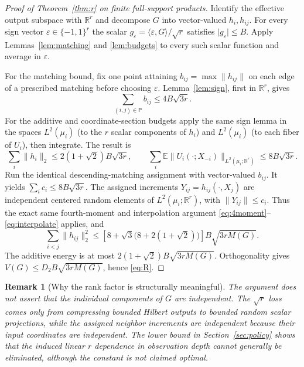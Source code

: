 \documentclass[11pt,letterpaper]{article}
\newtheorem{remark}[theorem]{Remark}
\theoremstyle{definition}\newtheorem{definition}[theorem]{Definition}
\newcommand{\E}{\mathbb E}
\newcommand{\abs}[1]{\lvert #1\rvert}
\newcommand{\norm}[1]{\lVert #1\rVert}
\begin{document}
\begin{proof}[Proof of Theorem~\ref{thm:r} on finite full-support products]
Identify the effective output subspace with $\mathbb R^r$ and decompose $G$ into vector-valued $h_i,h_{ij}$. For every sign vector $\varepsilon\in\{-1,1\}^r$ the scalar $g_\varepsilon=\langle\varepsilon,G\rangle/\sqrt r$ satisfies $\abs{g_\varepsilon}\le B$. Apply Lemmas~\ref{lem:matching} and \ref{lem:budgets} to every such scalar function and average in $\varepsilon$.

For the matching bound, fix one point attaining $b_{ij}=\max\norm{h_{ij}}$ on each edge of a prescribed matching before choosing $\varepsilon$. Lemma~\ref{lem:sign}, first in $\mathbb R^r$, gives
\begin{equation}\label{eq:vectorbudgets}
\sum_{(i,j)\in\mathsf P}b_{ij}\le4B\sqrt{3r}.
\end{equation}
For the additive and coordinate-section budgets apply the same sign lemma in the spaces $L^2(\mu_i)$ (to the $r$ scalar components of $h_i$) and $L^2(\mu_i)$ (to each fiber of $U_i$), then integrate. The result is
\begin{equation}\label{eq:vectorbudget2}
\sum_i\norm{h_i}_2\le2(1+\sqrt2)B\sqrt{3r},\qquad
\sum_i\E\norm{U_i(\cdot;X_{-i})}_{L^2(\mu_i;\mathbb R^r)}\le8B\sqrt{3r}.
\end{equation}
Run the identical descending-matching assignment with vector-valued $b_{ij}$. It yields $\sum_i c_i\le8B\sqrt{3r}$. The assigned increments $Y_{ij}=h_{ij}(\cdot,X_j)$ are independent centered random elements of $L^2(\mu_i;\mathbb R^r)$, with $\norm{Y_{ij}}\le c_i$. Thus the exact same fourth-moment and interpolation argument \eqref{eq:4moment}--\eqref{eq:interpolate} applies, and
\[
\sum_{i<j}\norm{h_{ij}}_2^2\le
\left[8+\sqrt3\bigl(8+2(1+\sqrt2)\bigr)\right]B\sqrt{3rM(G)}.
\]
The additive energy is at most $2(1+\sqrt2)B\sqrt{3rM(G)}$. Orthogonality gives $V(G)\le D_2 B\sqrt{3rM(G)}$, hence \eqref{eq:R}.
\end{proof}

\begin{remark}[Why the rank factor is structurally meaningful]
The argument does not assert that the individual components of $G$ are independent. The $\sqrt r$ loss comes only from compressing bounded Hilbert outputs to bounded random scalar projections, while the assigned neighbor increments are independent because their \emph{input coordinates} are independent. The lower bound in Section~\ref{sec:policy} shows that the induced linear $r$ dependence in observation depth cannot generally be eliminated, although the constant is not claimed optimal.
\end{remark}
\end{document}
